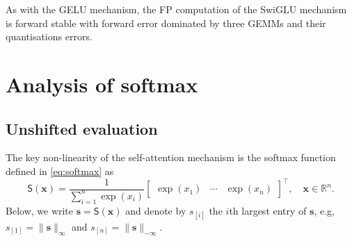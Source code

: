 \documentclass[namedate,webpdf,imanum]{ima-authoring-template}
\newcommand{\Real}{\mathbb{R}}
\newcommand{\Matrix}[1]{\mathbf{#1}}
\newcommand{\trans}{\intercal}
\newcommand{\Norm}[3][]{#1\| #2 #1\|_{\mathrm{#3}}}
\newcommand{\Layer}[1]{\mathsf{#1}}
\numberwithin{equation}{section}
\begin{document}
As with the GELU mechanism, the FP computation of the SwiGLU mechanism is forward stable with forward error dominated by three GEMMs and their quantisations errors.
\section{Analysis of softmax}
\label{sec:softmax}

\subsection{Unshifted evaluation}
The key non-linearity of the self-attention mechanism is the softmax function defined in \eqref{eq:softmax} as
\begin{equation*}
    \Layer{S}(\Matrix{x}) = \frac{1}{\sum_{i = 1}^n \exp(x_i)} \begin{bmatrix}
        \exp(x_1) & \cdots & \exp(x_n)
    \end{bmatrix}^\trans, \quad \Matrix{x} \in \Real^n.
\end{equation*}
Below, we write $\Matrix{s} = \Layer{S}(\Matrix{x})$ and denote by $s_{[i]}$ the $i$th largest entry of $\Matrix{s}$, e.g, $s_{[1]} = \Norm{\Matrix{s}}{\infty}$ and $s_{[n]} = \Norm{\Matrix{s}}{-\infty}$.
\end{document}
